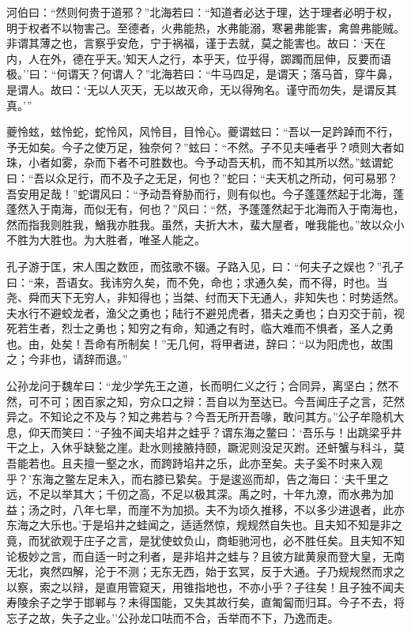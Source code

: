 \documentclass[]{article}
\begin{document}
河伯曰：``然则何贵于道邪？''北海若曰：``知道者必达于理，达于理者必明于权，明于权者不以物害己。至德者，火弗能热，水弗能溺，寒暑弗能害，禽兽弗能贼。非谓其薄之也，言察乎安危，宁于祸福，谨于去就，莫之能害也。故曰：`天在内，人在外，德在乎天。'知天人之行，本乎天，位乎得，踯躅而屈伸，反要而语极。''曰：``何谓天？何谓人？''北海若曰：``牛马四足，是谓天；落马首，穿牛鼻，是谓人。故曰：`无以人灭天，无以故灭命，无以得殉名。谨守而勿失，是谓反其真。'''

夔怜蚿，蚿怜蛇，蛇怜风，风怜目，目怜心。夔谓蚿曰：``吾以一足趻踔而不行，予无如矣。今子之使万足，独奈何？''蚿曰：``不然。子不见夫唾者乎？喷则大者如珠，小者如雾，杂而下者不可胜数也。今予动吾天机，而不知其所以然。''蚿谓蛇曰：``吾以众足行，而不及子之无足，何也？''蛇曰：``夫天机之所动，何可易邪？吾安用足哉！''蛇谓风曰：``予动吾脊胁而行，则有似也。今子蓬蓬然起于北海，蓬蓬然入于南海，而似无有，何也？''风曰：``然，予蓬蓬然起于北海而入于南海也，然而指我则胜我，鰌我亦胜我。虽然，夫折大木，蜚大屋者，唯我能也。''故以众小不胜为大胜也。为大胜者，唯圣人能之。

孔子游于匡，宋人围之数匝，而弦歌不辍。子路入见，曰：``何夫子之娱也？''孔子曰：``来，吾语女。我讳穷久矣，而不免，命也；求通久矣，而不得，时也。当尧、舜而天下无穷人，非知得也；当桀、纣而天下无通人，非知失也：时势适然。夫水行不避蛟龙者，渔父之勇也；陆行不避兕虎者，猎夫之勇也；白刃交于前，视死若生者，烈士之勇也；知穷之有命，知通之有时，临大难而不惧者，圣人之勇也。由，处矣！吾命有所制矣！''无几何，将甲者进，辞曰：``以为阳虎也，故围之；今非也，请辞而退。''

公孙龙问于魏牟曰：``龙少学先王之道，长而明仁义之行；合同异，离坚白；然不然，可不可；困百家之知，穷众口之辩：吾自以为至达已。今吾闻庄子之言，茫然异之。不知论之不及与？知之弗若与？今吾无所开吾喙，敢问其方。''公子牟隐机大息，仰天而笑曰：``子独不闻夫埳井之蛙乎？谓东海之鳖曰：`吾乐与！出跳梁乎井干之上，入休乎缺甃之崖。赴水则接腋持颐，蹶泥则没足灭跗。还虷蟹与科斗，莫吾能若也。且夫擅一壑之水，而跨跱埳井之乐，此亦至矣。夫子奚不时来入观乎？'东海之鳖左足未入，而右膝已絷矣。于是逡巡而却，告之海曰：`夫千里之远，不足以举其大；千仞之高，不足以极其深。禹之时，十年九潦，而水弗为加益；汤之时，八年七旱，而崖不为加损。夫不为顷久推移，不以多少进退者，此亦东海之大乐也。'于是埳井之蛙闻之，适适然惊，规规然自失也。且夫知不知是非之竟，而犹欲观于庄子之言，是犹使蚊负山，商蚷驰河也，必不胜任矣。且夫知不知论极妙之言，而自适一时之利者，是非埳井之蛙与？且彼方跐黄泉而登大皇，无南无北，爽然四解，沦于不测；无东无西，始于玄冥，反于大通。子乃规规然而求之以察，索之以辩，是直用管窥天，用锥指地也，不亦小乎？子往矣！且子独不闻夫寿陵余子之学于邯郸与？未得国能，又失其故行矣，直匍匐而归耳。今子不去，将忘子之故，失子之业。''公孙龙口呿而不合，舌举而不下，乃逸而走。
\end{document}
